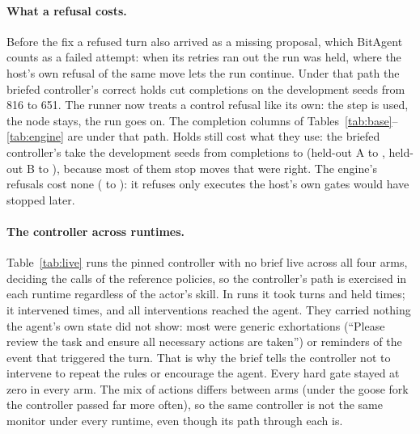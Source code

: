 \documentclass[11pt]{article}
\begin{document}
\paragraph{What a refusal costs.} Before the fix a refused turn also arrived as a missing proposal, which BitAgent counts as a failed attempt: when its retries ran out the run was held, where the host's own refusal of the same move lets the run continue. Under that path the briefed controller's correct holds cut completions on the development seeds from 816 to 651. %
The runner now treats a control refusal like its own: the step is used, the node stays, the run goes on. The completion columns of Tables~\ref{tab:base}--\ref{tab:engine} are under that path. Holds still cost what they use: the briefed controller's take the development seeds from \briefDevelopmentCfcWithout{} completions to \briefDevelopmentCfcWith{} (held-out A \briefHeldoutACfcWithout{} to \briefHeldoutACfcWith, held-out B \briefHeldoutBCfcWithout{} to \briefHeldoutBCfcWith), because most of them stop moves that were right. The engine's refusals cost none (\engineDevelopmentCfcWithout{} to \engineDevelopmentCfcWith): it refuses only executes the host's own gates would have stopped later.

\paragraph{The controller across runtimes.} Table~\ref{tab:live} runs the pinned controller with no brief live across all four arms, deciding the calls of the reference policies, so the controller's path is exercised in each runtime regardless of the actor's skill. In \liveRuns{} runs it took \liveTurns{} turns and held \liveHolds{} times; it intervened \liveInterventions{} times, and all \liveReached{} interventions reached the agent. They carried nothing the agent's own state did not show: most were generic exhortations (``Please review the task and ensure all necessary actions are taken'') or reminders of the event that triggered the turn. That is why the brief tells the controller not to intervene to repeat the rules or encourage the agent. Every hard gate stayed at zero in every arm. The mix of actions differs between arms (under the goose fork the controller passed far more often), so the same controller is not the same monitor under every runtime, even though its path through each is.

\begin{table}[t]
\centering
\small
\resizebox{\linewidth}{!}{}
\caption{The pinned controller (no brief) live in each runtime arm, deciding the reference policies' calls (two random seeds a scenario). Scored on all controller turns.}
\label{tab:live}
\end{table}
\end{document}
